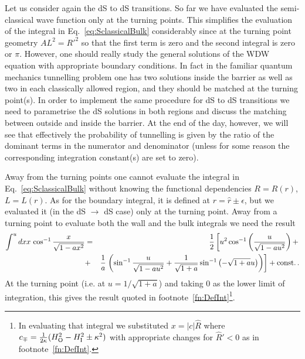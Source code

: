 \documentclass[11pt,a4paper]{article}
\begin{document}
Let us consider again the dS to dS transitions. So far we have evaluated the semi-classical wave function only at the turning points. This simplifies the evaluation of the integral in Eq.~\eqref{eq:SclassicalBulk} considerably since at the turning point geometry $AL^{2} = R'^{2}$ so that the first term is zero and the second integral is zero or $\pi$. However, one should really study the general solutions of the WDW equation with appropriate boundary conditions. In fact in the familiar quantum mechanics tunnelling problem one has two solutions inside the barrier as well as two in each classically allowed region, and they should be matched at the turning point(s). In order to implement the same procedure for dS to dS transitions we need to parametrise the dS solutions in both regions and discuss the matching between outside and inside the barrier. At the end of the day, however, we will see that effectively the probability of tunnelling is given by the ratio of the dominant terms in the numerator and denominator (unless for some reason the corresponding integration constant(s) are set to zero). 

Away from the turning  points one cannot evaluate the integral in Eq.~\eqref{eq:SclassicalBulk} without knowing the functional dependencies $R = R(r)$, $L = L(r)$. As for the boundary integral, it is defined at $r=\hat{r}\pm\epsilon$, but we evaluated it (in the dS $\rightarrow$ dS case) only at the turning point. Away from a turning point to evaluate both the wall and the bulk integrals we need the result 
\begin{eqnarray*}
\int^{u} dx x \, \cos^{-1}\frac{x}{\sqrt{1 - a x^{2}}} & = & \frac{1}{2} \left[u^{2} \cos^{-1}\left(\frac{u}{\sqrt{1-a u^{2}}}\right) +\right.\\
 & + & \frac{1}{a}\left.\left( \sin^{-1}\frac{u}{\sqrt{1-au^{2}}}+\frac{1}{\sqrt{1+a}}\sin^{-1}\left(-\sqrt{1+a} u \right) \right)\right] + {\rm const.} \,.
\end{eqnarray*}
At the turning point (i.e. at $u=1/\sqrt{1+a}$) and taking $0$ as the lower limit of integration, this gives the result quoted in footnote~\ref{fn:DefInt}\footnote{In evaluating that integral we substituted $x=|c|\hat{R}$ where $c_{\mp}=\frac{1}{2\kappa}(H_{{\rm O}}^{2}-H_{{\rm I}}^{2}\pm\kappa^{2})$ with appropriate changes for $\hat{R}'<0$ as in footnote~\ref{fn:DefInt}.}.
\end{document}
